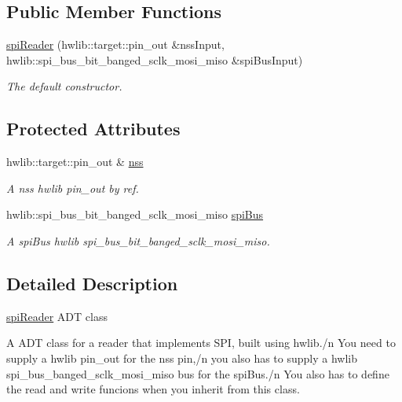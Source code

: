 \subsection*{Public Member Functions}
\begin{DoxyCompactItemize}
\item 
\hyperlink{classspiReader_af8eca236eb5cfe4e806f0151227e42b4}{spi\+Reader} (hwlib\+::target\+::pin\+\_\+out \&nss\+Input, hwlib\+::spi\+\_\+bus\+\_\+bit\+\_\+banged\+\_\+sclk\+\_\+mosi\+\_\+miso \&spi\+Bus\+Input)
\begin{DoxyCompactList}\small\item\em The default constructor. \end{DoxyCompactList}\end{DoxyCompactItemize}
\subsection*{Protected Attributes}
\begin{DoxyCompactItemize}
\item 
hwlib\+::target\+::pin\+\_\+out \& \hyperlink{classspiReader_a2a241a80ce921c4df38b3080d839850f}{nss}
\begin{DoxyCompactList}\small\item\em A nss hwlib pin\+\_\+out by ref. \end{DoxyCompactList}\item 
hwlib\+::spi\+\_\+bus\+\_\+bit\+\_\+banged\+\_\+sclk\+\_\+mosi\+\_\+miso \hyperlink{classspiReader_adb87e7c8ca2a11337b67fe8efce50262}{spi\+Bus}
\begin{DoxyCompactList}\small\item\em A spi\+Bus hwlib spi\+\_\+bus\+\_\+bit\+\_\+banged\+\_\+sclk\+\_\+mosi\+\_\+miso. \end{DoxyCompactList}\end{DoxyCompactItemize}


\subsection{Detailed Description}
\hyperlink{classspiReader}{spi\+Reader} A\+DT class 

A A\+DT class for a reader that implements S\+PI, built using hwlib./n You need to supply a hwlib pin\+\_\+out for the nss pin,/n you also has to supply a hwlib spi\+\_\+bus\+\_\+banged\+\_\+sclk\+\_\+mosi\+\_\+miso bus for the spi\+Bus./n You also has to define the read and write funcions when you inherit from this class. 

